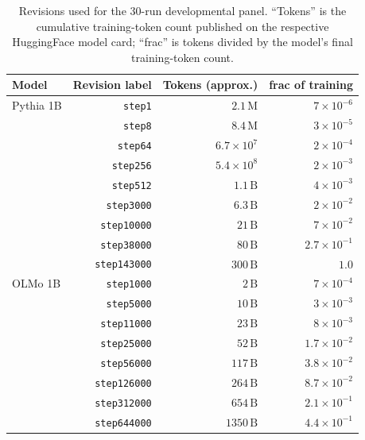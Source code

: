 \documentclass[11pt]{article}
\begin{document}
\begin{table}[t]
\centering
\caption{Revisions used for the 30-run developmental panel.
``Tokens'' is the cumulative training-token count published on the
respective HuggingFace model card; ``frac'' is tokens divided by the
model's final training-token count.}
\label{tab:revisions}
\small
\begin{tabular}{l r r r}
\toprule
Model & Revision label & Tokens (approx.) & frac of training \\
\midrule
Pythia 1B           & \texttt{step1}      & $2.1\,\mathrm{M}$    & $7\times10^{-6}$ \\
                    & \texttt{step8}      & $8.4\,\mathrm{M}$    & $3\times10^{-5}$ \\
                    & \texttt{step64}     & $6.7\times10^{7}$    & $2\times10^{-4}$ \\
                    & \texttt{step256}    & $5.4\times10^{8}$    & $2\times10^{-3}$ \\
                    & \texttt{step512}    & $1.1\,\mathrm{B}$    & $4\times10^{-3}$ \\
                    & \texttt{step3000}   & $6.3\,\mathrm{B}$    & $2\times10^{-2}$ \\
                    & \texttt{step10000}  & $21\,\mathrm{B}$     & $7\times10^{-2}$ \\
                    & \texttt{step38000}  & $80\,\mathrm{B}$     & $2.7\times10^{-1}$ \\
                    & \texttt{step143000} & $300\,\mathrm{B}$    & $1.0$ \\
\midrule
OLMo 1B             & \texttt{step1000}    & $2\,\mathrm{B}$      & $7\times10^{-4}$ \\
                    & \texttt{step5000}    & $10\,\mathrm{B}$     & $3\times10^{-3}$ \\
                    & \texttt{step11000}   & $23\,\mathrm{B}$     & $8\times10^{-3}$ \\
                    & \texttt{step25000}   & $52\,\mathrm{B}$     & $1.7\times10^{-2}$ \\
                    & \texttt{step56000}   & $117\,\mathrm{B}$    & $3.8\times10^{-2}$ \\
                    & \texttt{step126000}  & $264\,\mathrm{B}$    & $8.7\times10^{-2}$ \\
                    & \texttt{step312000}  & $654\,\mathrm{B}$    & $2.1\times10^{-1}$ \\
                    & \texttt{step644000}  & $1350\,\mathrm{B}$   & $4.4\times10^{-1}$ \\

\end{tabular}
\end{table}
\end{document}
